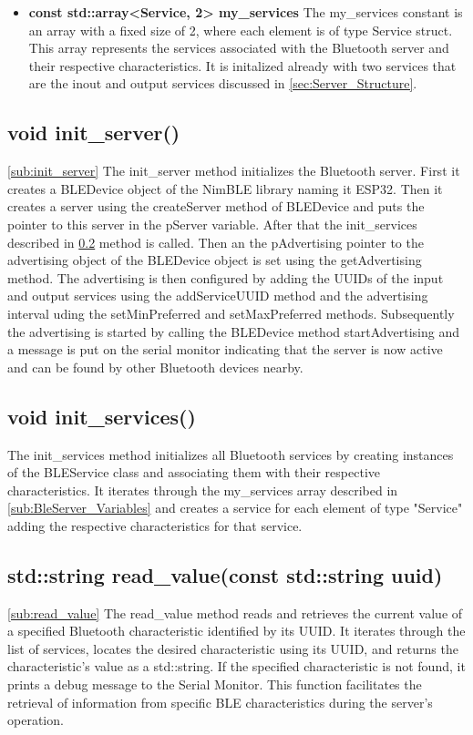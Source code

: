 \begin{itemize}
	\item \textbf{const std::array<Service, 2> my\_services}
	\newline
	The my\_services constant is an array with a fixed size of 2, where each element is of type Service struct. 
	This array represents the services associated with the Bluetooth server and their respective characteristics. 
	It is initalized already with two services that are the inout and output services discussed in \ref{sec:Server_Structure}. 
	
\end{itemize}

\subsection{void init\_server()}
\ref{sub:init_server}
The init\_server method initializes the Bluetooth server. 
First it creates a BLEDevice object of the NimBLE library naming it ESP32. 
Then it creates a server using the createServer method of BLEDevice and puts the pointer to this server in the pServer variable. 
After that the init\_services described in \ref{sub:init_services} method is called. 
Then an the pAdvertising pointer to the advertising object of the BLEDevice object is set using the getAdvertising method. 
The advertising is then configured by adding the UUIDs  of the input and output services using the addServiceUUID method and the advertising interval uding the setMinPreferred and setMaxPreferred methods. 
Subsequently the advertising is started by calling the BLEDevice method startAdvertising and a message is put on the serial monitor indicating that the server is now active and can be found by other Bluetooth devices nearby. 

\subsection{void init\_services()}
\label{sub:init_services}
The init\_services method initializes all Bluetooth services by creating instances of the BLEService class and associating them with their respective characteristics. 
It iterates through the my\_services array described in \ref{sub:BleServer_Variables} and creates a service for each element of type "Service" adding the respective characteristics for that service. 

\subsection{std::string read\_value(const std::string uuid)}
\ref{sub:read_value}
The read\_value method reads and retrieves the current value of a specified Bluetooth characteristic identified by its UUID. 
It iterates through the list of services, locates the desired characteristic using its UUID, and returns the characteristic's value as a std::string. 
If the specified characteristic is not found, it prints a debug message to the Serial Monitor. 
This function facilitates the retrieval of information from specific BLE characteristics during the server's operation.

